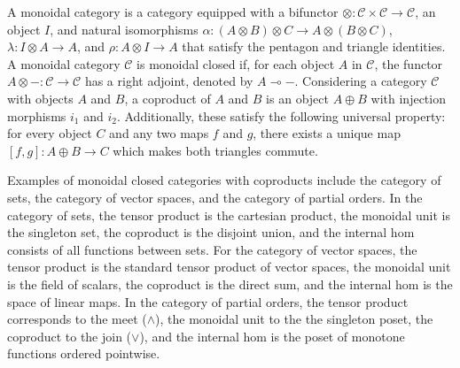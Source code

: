 \documentclass[10pt,a4paper]{amsart}
\theoremstyle{definition}
\theoremstyle{definition}
\theoremstyle{definition}
\theoremstyle{definition}
\theoremstyle{definition}
\theoremstyle{definition}
\begin{document}
A monoidal category is a category equipped with a bifunctor $\otimes: \mathcal{C} \times \mathcal{C} \xrightarrow{} \mathcal{C}$, an object $I$, and natural isomorphisms $\alpha: (A \otimes B) \otimes C \xrightarrow{} A \otimes (B \otimes C)$, $\lambda: I \otimes A \xrightarrow{} A$, and $\rho: A \otimes I \xrightarrow{} A$ that satisfy the pentagon and triangle identities. A monoidal category $\mathcal{C}$ is monoidal closed if, for each object $A$ in $\mathcal{C}$, the functor $A \otimes - : \mathcal{C} \to \mathcal{C}$ has a right adjoint, denoted by $A \multimap -$. %
Considering a category $\mathcal{C}$  with objects $A$ and $B$, a coproduct of $A$ and $B$ is an object $A \oplus B$ with injection morphisms $i_1$ and $i_2$. Additionally, these satisfy the following universal property: for every object $C$ and any two maps $f $ and $g$, there exists a unique map $[f,g] : A \oplus B \rightarrow C$ which makes both triangles commute.


Examples of monoidal closed categories with coproducts include the category of sets, the category of vector spaces, and the category of partial orders. In the category of sets, the tensor product is the cartesian product, the monoidal unit is the singleton set, the coproduct is the disjoint union, and the internal hom consists of all functions between sets. For the category of vector spaces, the tensor product is the standard tensor product of vector spaces, the monoidal unit is the field of scalars, the coproduct is the direct sum, and the internal hom is the space of linear maps. In the category of partial orders, the tensor product corresponds to the meet ($\wedge$), the monoidal unit to the the singleton poset, the coproduct to the join ($\vee$), and the internal hom is the poset of monotone functions ordered pointwise.
\end{document}
